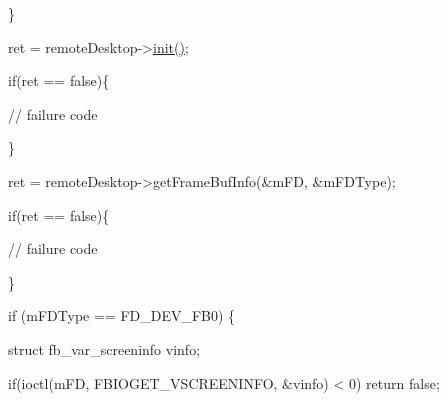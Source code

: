 \begin{DoxyPre}	 \}\end{DoxyPre}



\begin{DoxyPre}	 ret = remoteDesktop->\hyperlink{classknoxremotedesktop_1_1IRemoteDesktop_a7bed40d98c61713a69cf1dad8b37beae}{init()};\end{DoxyPre}



\begin{DoxyPre}	 if(ret == false)\{\end{DoxyPre}



\begin{DoxyPre}		 // failure code\end{DoxyPre}



\begin{DoxyPre}	 \}\end{DoxyPre}



\begin{DoxyPre}	 ret = remoteDesktop->getFrameBufInfo(&mFD, &mFDType);\end{DoxyPre}



\begin{DoxyPre}	 if(ret == false)\{\end{DoxyPre}



\begin{DoxyPre}		 // failure code\end{DoxyPre}



\begin{DoxyPre}	 \}\end{DoxyPre}



\begin{DoxyPre}	 if (mFDType == FD\_DEV\_FB0) \{\end{DoxyPre}



\begin{DoxyPre}		 struct fb\_var\_screeninfo vinfo;\end{DoxyPre}



\begin{DoxyPre}		 if(ioctl(mFD, FBIOGET\_VSCREENINFO, &vinfo) < 0) return false;\end{DoxyPre}



